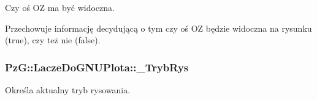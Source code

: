 Czy oś O\+Z ma być widoczna. 

Przechowuje informację decydującą o tym czy oś O\+Z będzie widoczna na rysunku ({\ttfamily true}), czy też nie ({\ttfamily false}). \hypertarget{class_pz_g_1_1_lacze_do_g_n_u_plota_a00e3a51bb47d3fb26eee875dc48215db}{
\subsubsection[{\+\_\+\+Tryb\+Rys}]{ Pz\+G\+::\+Lacze\+Do\+G\+N\+U\+Plota\+::\+\_\+\+Tryb\+Rys\hspace{0.3cm}{\ttfamily [protected]}}}\label{class_pz_g_1_1_lacze_do_g_n_u_plota_a00e3a51bb47d3fb26eee875dc48215db}


Określa aktualny tryb rysowania. 

